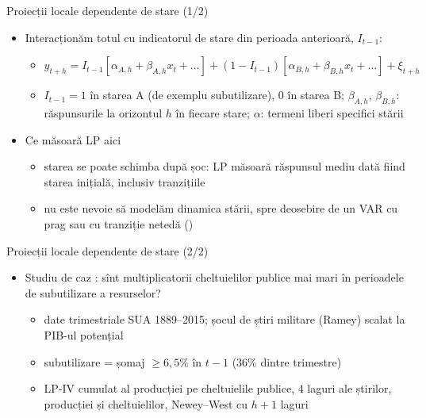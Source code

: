 \begin{frame}{Proiecții locale dependente de stare (1/2)}
\itemsize{\small}
\begin{itemize}
    \item Interacționăm totul cu indicatorul de stare din perioada anterioară, $I_{t-1}$:
    \begin{itemize}
        \item $y_{t+h} = I_{t-1}[\alpha_{A,h} + \beta_{A,h}x_t + \dots] + (1 - I_{t-1})[\alpha_{B,h} + \beta_{B,h}x_t + \dots] + \xi_{t+h}$
        \item $I_{t-1} = 1$ în starea A (de exemplu subutilizare), 0 în starea B; $\beta_{A,h}$, $\beta_{B,h}$: răspunsurile la orizontul $h$ în fiecare stare; $\alpha$: termeni liberi specifici stării
    \end{itemize}
    \item Ce măsoară LP aici
    \begin{itemize}
        \item starea se poate schimba după șoc: LP măsoară răspunsul mediu dată fiind starea inițială, inclusiv tranzițiile
        \item nu este nevoie să modelăm dinamica stării, spre deosebire de un VAR cu prag sau cu tranziție netedă ()
    \end{itemize}
\end{itemize}
\end{frame}

\begin{frame}{Proiecții locale dependente de stare (2/2)}
\itemsize{\small}
\begin{itemize}
    \item Studiu de caz : sînt multiplicatorii cheltuielilor publice mai mari în perioadele de subutilizare a resurselor?
    \begin{itemize}
        \item date trimestriale SUA 1889--2015; șocul de știri militare (Ramey) scalat la PIB-ul potențial
        \item subutilizare = șomaj $\ge 6{,}5\%$ în $t - 1$ (36\% dintre trimestre)
        \item LP-IV cumulat al producției pe cheltuielile publice, 4 laguri ale știrilor, producției și cheltuielilor, Newey--West cu $h + 1$ laguri
    \end{itemize}
\end{itemize}
\end{frame}

